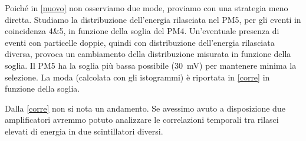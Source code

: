 Poiché in \autoref{nuovo} non osserviamo due mode,
proviamo con una strategia meno diretta.
Studiamo la distribuzione dell'energia rilasciata nel PM5,
per gli eventi in coincidenza 4\&5,
in funzione della soglia del PM4.
Un'eventuale presenza di eventi con particelle doppie,
quindi con distribuzione dell'energia rilasciata diversa,
provoca un cambiamento della distribuzione misurata in funzione della soglia.
Il PM5 ha la soglia più bassa possibile (\SI{30}{mV}) per mantenere minima la selezione.
La moda (calcolata con gli istogrammi) è riportata in \autoref{corre} in funzione della soglia.

Dalla \autoref{corre} non si nota un andamento.
Se avessimo avuto a disposizione due amplificatori
avremmo potuto analizzare le correlazioni temporali tra rilasci elevati di energia in due scintillatori diversi.

